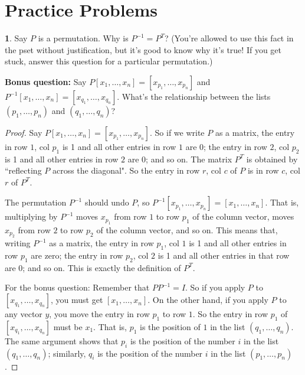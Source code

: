 \documentclass{article}
\theoremstyle{definition}
\newtheorem{prob}{}
\begin{document}
\section*{Practice Problems}

\begin{prob}
	Say $P$ is a permutation. Why is $P^{-1}=P^T$? (You're allowed to use this fact in the pset without justification, but it's good to know why it's true! If you get stuck, answer this question for a particular permutation.)
	
	\vspace{12pt}

\noindent\textbf{Bonus question:} Say $P[x_1, \dots, x_n]=[x_{p_1}, \dots, x_{p_n}]$ and $P^{-1}[x_1, \dots, x_n]=[x_{q_1}, \dots, x_{q_n}]$. What's the relationship between the lists $(p_1, \dots, p_n)$ and $(q_1, \dots, q_n)$?

\end{prob}

\begin{proof}
Say $P[x_1, \dots, x_n]=[x_{p_1}, \dots, x_{p_n}]$. So if we write $P$ as a matrix, the entry in row $1$, col $p_1$ is 1 and all other entries in row $1$ are 0; the entry in row $2$, col $p_2$ is 1 and all other entries in row $2$ are 0; and so on. The matrix $P^T$ is obtained by ``reflecting $P$ across the diagonal". So the entry in row $r$, col $c$ of $P$ is in row $c$, col $r$ of $P^T$.
	
	The permutation $P^{-1}$ should undo $P$, so $P^{-1}[x_{p_1}, \dots, x_{p_n}]= [x_1, \dots, x_n]$. That is, multiplying by $P^{-1}$ moves $x_{p_1}$ from row $1$ to row $p_1$ of the column vector, moves $x_{p_2}$ from row $2$ to row $p_2$ of the column vector, and so on. This means that, writing $P^{-1}$ as a matrix, the entry in row $p_1$, col $1$ is 1 and all other entries in row $p_1$ are zero; the entry in row $p_2$, col $2$ is 1 and all other entries in that row are 0; and so on. This is exactly the definition of $P^T$.
	
	For the bonus question: Remember that $PP^{-1}=I$. So if you apply $P$ to $[x_{q_1}, \dots, x_{q_n}]$, you must get $[x_1, \dots, x_n]$. On the other hand, if you apply $P$ to any vector $y$, you move the entry in row $p_1$ to row $1$. So the entry in row $p_1$ of $[x_{q_1}, \dots, x_{q_n}]$ must be $x_1$. That is, $p_1$ is the position of $1$ in the list $(q_1, \dots, q_n)$. The same argument shows that $p_i$ is the position of the number $i$ in the list $(q_1, \dots, q_n)$; similarly, $q_i$ is the position of the number $i$ in the list $(p_1, \dots, p_n)$.
\end{proof}
\end{document}
